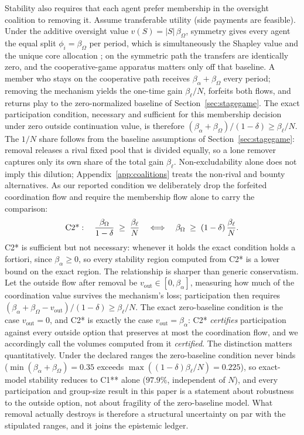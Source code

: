 \documentclass[manuscript,screen,review]{jair}
\begin{document}
Stability also requires that each agent prefer membership in the oversight coalition to removing it. Assume transferable utility (side payments are feasible). Under the additive oversight value $v(S) = |S|\,\beta_\Omega$, symmetry gives every agent the equal split $\phi_i = \beta_\Omega$ per period, which is simultaneously the Shapley value \cite{shapley.1953} and the unique core allocation \cite{bondareva.1963}; on the symmetric path the transfers are identically zero, and the cooperative-game apparatus matters only off that baseline. A member who stays on the cooperative path receives $\beta_\alpha + \beta_\Omega$ every period; removing the mechanism yields the one-time gain $\beta_\ell/N$, forfeits both flows, and returns play to the zero-normalized baseline of Section~\ref{sec:stagegame}. The exact participation condition, necessary and sufficient for this membership decision under zero outside continuation value, is therefore $(\beta_\alpha + \beta_\Omega)/(1-\delta) \geq \beta_\ell/N$. The $1/N$ share follows from the baseline assumptions of Section~\ref{sec:stagegame}: removal releases a rival fixed pool that is divided equally, so a lone remover captures only its own share of the total gain $\beta_\ell$. Non-excludability alone does not imply this dilution; Appendix~\ref{app:coalitions} treats the non-rival and bounty alternatives. As our reported condition we deliberately drop the forfeited coordination flow and require the membership flow alone to carry the comparison:
\begin{equation*}
\textnormal{C2*}:\quad \frac{\beta_\Omega}{1-\delta} \;\geq\; \frac{\beta_\ell}{N}
\quad\Longleftrightarrow\quad
\beta_\Omega \;\geq\; (1-\delta)\,\frac{\beta_\ell}{N} .
\end{equation*}
C2* is sufficient but not necessary: whenever it holds the exact condition holds a fortiori, since $\beta_\alpha \geq 0$, so every stability region computed from C2* is a lower bound on the exact region. The relationship is sharper than generic conservatism. Let the outside flow after removal be $v_{\mathrm{out}} \in [0, \beta_\alpha]$, measuring how much of the coordination value survives the mechanism's loss; participation then requires $(\beta_\alpha + \beta_\Omega - v_{\mathrm{out}})/(1-\delta) \geq \beta_\ell/N$. The exact zero-baseline condition is the case $v_{\mathrm{out}} = 0$, and C2* is exactly the case $v_{\mathrm{out}} = \beta_\alpha$: C2* \emph{certifies} participation against every outside option that preserves at most the coordination flow, and we accordingly call the volumes computed from it \emph{certified}. The distinction matters quantitatively. Under the declared ranges the zero-baseline condition never binds ($\min(\beta_\alpha + \beta_\Omega) = 0.35$ exceeds $\max((1-\delta)\beta_\ell/N) = 0.225$), so exact-model stability reduces to C1** alone ($97.9\%$, independent of $N$), and every participation and group-size result in this paper is a statement about robustness to the outside option, not about fragility of the zero-baseline model. What removal actually destroys is therefore a structural uncertainty on par with the stipulated ranges, and it joins the epistemic ledger.
\end{document}
